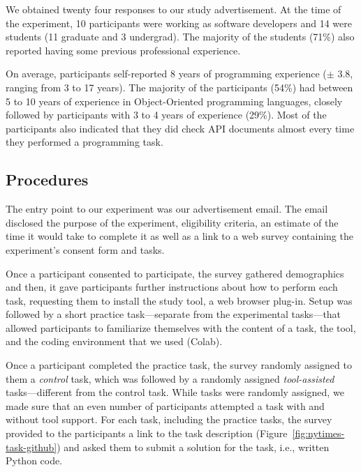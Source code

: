 




We obtained twenty four responses to our study advertisement. 
At the time of the experiment, 10 participants were working as software
developers and 14 were students (11 graduate and 3 undergrad).
The majority of the students (71\%) also reported having some previous professional experience.


On average, participants self-reported 8 years of programming experience ({\small $\pm$} 3.8, ranging from 3 to 17 years).
The majority of the participants (54\%) had between 5 to 10 years of experience in Object-Oriented programming languages,
closely followed by participants  with  3 to 4 years of experience (29\%). 
Most of the participants also indicated that they did check API documents almost every time they performed a programming task. 







\subsection{Procedures}
\label{cp6:procedures}




The entry point to our experiment was our advertisement email.
The email disclosed the purpose of the experiment, eligibility criteria, an estimate of the time it would take to complete it as well as a link 
to a web survey containing the experiment's consent form and tasks. 


Once a participant consented to participate, the survey gathered demographics and then, 
it gave participants further instructions 
about how to perform each task, requesting them to install the study tool, a web browser plug-in.
Setup was followed by a short practice task---separate from the experimental tasks---that allowed participants to familiarize themselves with the content of a task, the tool, and the coding environment that we used (Colab). 


Once a participant completed the practice task, the survey randomly assigned to them a \textit{control} task, which was followed by a randomly assigned \textit{tool-assisted} tasks---different from the control task. While tasks were randomly assigned, we made sure that an even number of participants attempted a task with and without tool support.
For each task, including the practice tasks, the survey provided to the participants a link 
to the task description (Figure~\ref{fig:nytimes-task-github}) and asked them to submit a solution for the task, i.e., written Python code. 


